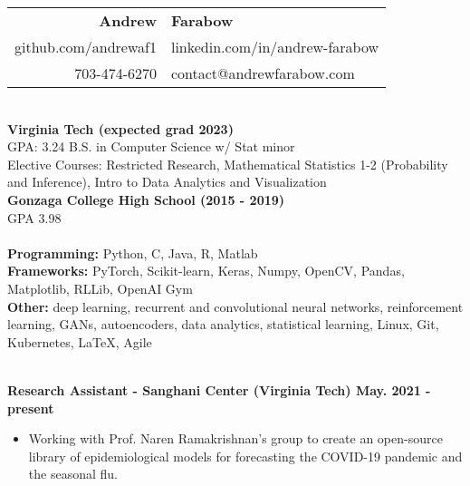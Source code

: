 \documentclass{article}
\begin{document}
  \begin{center}
    \begin{tabular}{r l}
      {\huge\textbf{Andrew}} & {\huge\textbf{Farabow}} \\
      \hspace{35pt} github.com/andrewaf1 & linkedin.com/in/andrew-farabow \\
      703-474-6270 & contact@andrewfarabow.com \\
    \end{tabular}


  \begin{flushleft}
    \begin{multicols}{2}
      {\large\textbf{\underline{}}} \\
      \textbf{Virginia Tech (expected grad 2023)} \\
      GPA: 3.24 \; B.S. in Computer Science w/ Stat minor \\
      Elective Courses: Restricted Research, Mathematical Statistics 1-2 (Probability and Inference), Intro to Data Analytics and Visualization\\
      \textbf{Gonzaga College High School	(2015 - 2019)} \\
      GPA 3.98 \\
     

    \columnbreak
    {\large\textbf{\underline{}}} \\
    {\textbf{Programming:}} Python, C, Java, R, Matlab \\
    {\textbf{Frameworks:}} PyTorch, Scikit-learn, Keras, Numpy, OpenCV, Pandas, Matplotlib, RLLib, OpenAI Gym \\
    {\textbf{Other:}} deep learning, recurrent and convolutional neural networks, reinforcement learning, GANs, autoencoders, data analytics, statistical learning, Linux, Git, Kubernetes, LaTeX, Agile \\

    \end{multicols}

    {\large\textbf{\underline{}}} \\

    \textbf{Research Assistant - Sanghani Center (Virginia Tech) \hfill May. 2021 - present}
    \begin{itemize}
      \itemsep0em
      \item Working with Prof. Naren Ramakrishnan's group to create an open-source library of epidemiological models for forecasting the COVID-19 pandemic and the seasonal flu.
    \end{itemize}


\end{flushleft}
\end{center}
\end{document}
